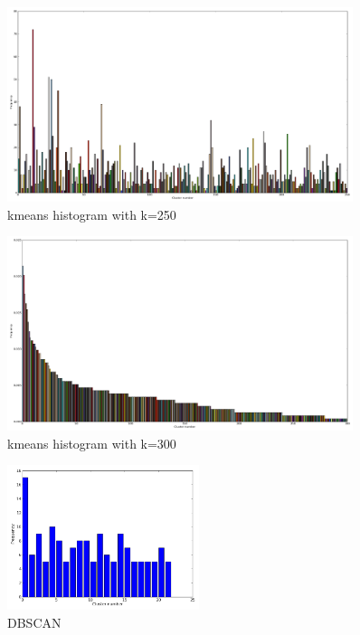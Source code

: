 \documentclass[10pt,twocolumn,letterpaper]{article}
\begin{document}
\begin{figure}[p]
  \centering
  \includegraphics[width=0.90\textwidth]{../250_histogram.png}
  \caption{kmeans histogram with k=250}
  \label{k-250}
\end{figure}

\begin{figure}[p]
  \centering
  \includegraphics[width=0.90\textwidth]{../300_histogram.png}
  \caption{kmeans histogram with k=300}
  \label{k-300}
\end{figure}

\begin{figure}[p]
  \centering
  \includegraphics[width=0.50\textwidth]{../dbscan_hist.png}
  \caption{DBSCAN}
  \label{dbscan}
\end{figure}
\end{document}
